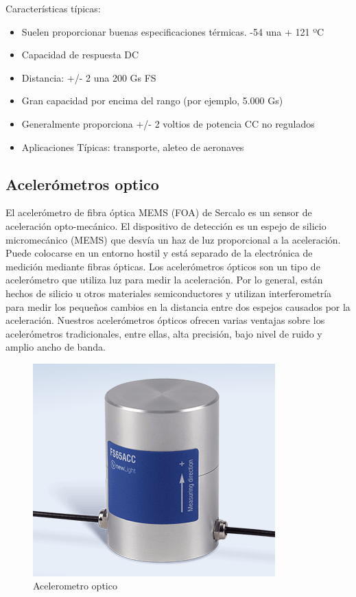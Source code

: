 Características típicas:
\begin{itemize}
    \item Suelen proporcionar buenas especificaciones térmicas. -54 una + 121 ºC
    \item Capacidad de respuesta DC
    \item Distancia:  +/- 2 una 200 Gs FS
    \item Gran capacidad por encima del rango (por ejemplo, 5.000 Gs)
    \item Generalmente proporciona +/- 2 voltios de potencia CC no regulados
    \item Aplicaciones Típicas: transporte, aleteo de aeronaves
\end{itemize}

\subsection{Acelerómetros optico}

El acelerómetro de fibra óptica MEMS (FOA) de Sercalo es un sensor de aceleración opto-mecánico. El dispositivo de detección es un espejo de silicio micromecánico (MEMS) que desvía un haz de luz proporcional a la aceleración. Puede colocarse en un entorno hostil y está separado de la electrónica de medición mediante fibras ópticas.
Los acelerómetros ópticos son un tipo de acelerómetro que utiliza luz para medir la aceleración. Por lo general, están hechos de silicio u otros materiales semiconductores y utilizan interferometría para medir los pequeños cambios en la distancia entre dos espejos causados por la aceleración. Nuestros acelerómetros ópticos ofrecen varias ventajas sobre los acelerómetros tradicionales, entre ellas, alta precisión, bajo nivel de ruido y amplio ancho de banda.


\begin{figure}[h]
	\centering
	\includegraphics[width=0.7\linewidth]{img/acelerometro optico.png}
	\caption{Acelerometro optico}
	\label{fig:insertarimagen}
\end{figure}

